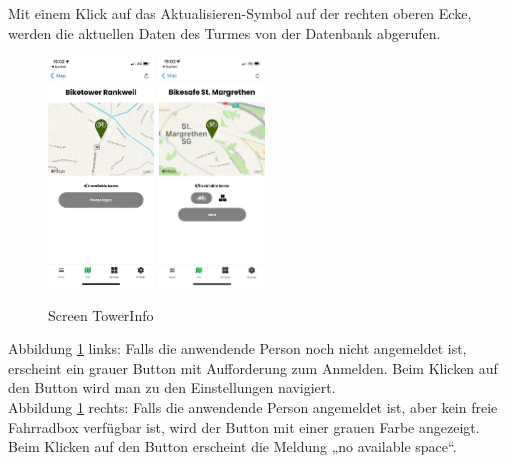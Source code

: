 Mit einem Klick auf das Aktualisieren-Symbol auf der rechten oberen Ecke, werden die aktuellen Daten des Turmes von der Datenbank abgerufen. \\
\begin{figure}[H]
  \centering
  \includegraphics[width=0.25\textwidth]{images/app-screenshots/screentowerinfoa.png}
  \includegraphics[width=0.25\textwidth]{images/app-screenshots/screentowerinfob.png}
  \caption{Screen TowerInfo}
  \label{fig:screentowerinfograu}
\end{figure}
Abbildung \ref{fig:screentowerinfograu} links: Falls die anwendende Person noch nicht angemeldet ist, erscheint ein grauer Button mit Aufforderung zum Anmelden. Beim Klicken auf den Button wird man zu den Einstellungen navigiert.\\
Abbildung \ref{fig:screentowerinfograu} rechts: Falls die anwendende Person angemeldet ist, aber kein freie Fahrradbox verfügbar ist, wird der Button mit einer grauen Farbe angezeigt. Beim Klicken auf den Button erscheint die Meldung „no available space“.\\
